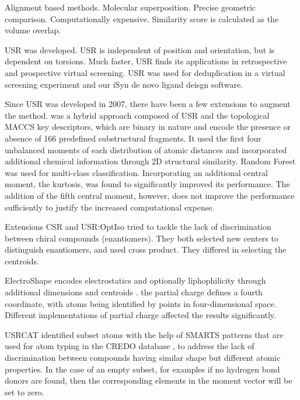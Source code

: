\documentclass[twocolumn]{svjour3}          %
\begin{document}
Alignment based methods. Molecular superposition. Precise geometric comparison. Computationally expensive. Similarity score is calculated as the volume overlap.

USR \cite{1379,1280} was developed. USR is independent of position and orientation, but is dependent on torsions. Much faster, USR finds its applications in retrospective \cite{1332} and prospective \cite{1380} virtual screening. USR was used for deduplication in a virtual screening experiment \cite{1390} and our iSyn \cite{1381,1387} de novo ligand deisgn software. %

Since USR was developed in 2007, there have been a few extensions \cite{1333,1334,1335,1337,1338,1331} to augment the method. \cite{1333} was a hybrid approach composed of USR and the topological MACCS key descriptors, which are binary in nature and encode the presence or absence of 166 predefined substructural fragments. It used the first four unbalanced moments of each distribution of atomic distances and incorporated additional chemical information through 2D structural similarity. Random Forest \cite{1310} was used for multi-class classification. Incorporating an additional central moment, the kurtosis, was found to significantly improved its performance. The addition of the fifth central moment, however, does not improve the performance sufficiently to justify the increased computational expense.

Extensions CSR \cite{1334} and USR:OptIso \cite{1335} tried to tackle the lack of discrimination between chiral compounds (enantiomers). They both selected new centers to distinguish enantiomers, and used cross product. They differed in selecting the centroids.

ElectroShape encodes electrostatics and optionally liphophilicity through additional dimensions and centroids \cite{1337,1338}. \cite{1337} the partial charge defines a fourth coordinate, with atoms being identified by points in four-dimensional space. Different implementations of partial charge affected the results significantly.

USRCAT \cite{1331} identified subset atoms with the help of SMARTS patterns that are used for atom typing in the CREDO database \cite{522}, to address the lack of discrimination between compounds having similar shape but different atomic properties. In the case of an empty subset, for examples if no hydrogen bond donors are found, then the corresponding elements in the moment vector will be set to zero.
\end{document}
